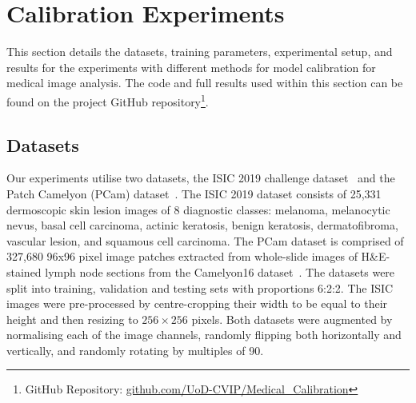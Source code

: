 \section{Calibration Experiments}
\label{sec:calibration_experiments}
This section details the datasets, training parameters, experimental setup, and results for the experiments with different methods for model calibration for medical image analysis. The code and full results used within this section can be found on the project GitHub repository\footnote{GitHub Repository: \url{github.com/UoD-CVIP/Medical_Calibration}}.


\subsection{Datasets}
Our experiments utilise two datasets, the ISIC 2019 challenge dataset~\citep{codella2018skin,combalia2019bcn20000,tschandl2018ham10000} and the Patch Camelyon (PCam) dataset~\citep{veeling2018rotation}. The ISIC 2019 dataset consists of 25,331 dermoscopic skin lesion images of 8 diagnostic classes: melanoma, melanocytic nevus, basal cell carcinoma, actinic keratosis, benign keratosis, dermatofibroma, vascular lesion, and squamous cell carcinoma. The PCam dataset is comprised of 327,680 96x96 pixel image patches extracted from whole-slide images of H\&E-stained lymph node sections from the Camelyon16 dataset~\citep{bejnordi2017diagnostic}. The datasets were split into training, validation and testing sets with proportions 6:2:2. The ISIC images were pre-processed by centre-cropping their width to be equal to their height and then resizing to $256 \times 256$ pixels. Both datasets were augmented by normalising each of the image channels, randomly flipping both horizontally and vertically, and randomly rotating by multiples of 90\textdegree.

